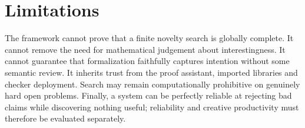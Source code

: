 \section{Limitations}

The framework cannot prove that a finite novelty search is globally complete. It cannot remove the need for mathematical judgement about interestingness. It cannot guarantee that formalization faithfully captures intention without some semantic review. It inherits trust from the proof assistant, imported libraries and checker deployment. Search may remain computationally prohibitive on genuinely hard open problems. Finally, a system can be perfectly reliable at rejecting bad claims while discovering nothing useful; reliability and creative productivity must therefore be evaluated separately.
